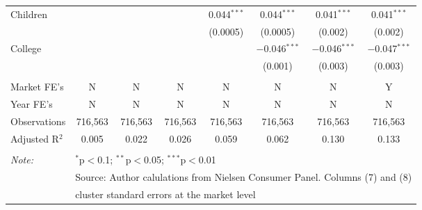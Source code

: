 \begin{table}[!htbp]
\begin{tabular}{@{\extracolsep{5pt}}lccccccc}
  Children &  &  &  & 0.044$^{***}$ & 0.044$^{***}$ & 0.041$^{***}$ & 0.041$^{***}$ \\ 
  &  &  &  & (0.0005) & (0.0005) & (0.002) & (0.002) \\ 
  College &  &  &  &  & $-$0.046$^{***}$ & $-$0.046$^{***}$ & $-$0.047$^{***}$ \\ 
  &  &  &  &  & (0.001) & (0.003) & (0.003) \\ 
 \hline \\[-1.8ex] 
Market FE's & N & N & N & N & N & N & Y \\ 
Year FE's & N & N & N & N & N & N & N \\ 
Observations & 716,563 & 716,563 & 716,563 & 716,563 & 716,563 & 716,563 & 716,563 \\ 
Adjusted R$^{2}$ & 0.005 & 0.022 & 0.026 & 0.059 & 0.062 & 0.130 & 0.133 \\ 
\hline 
\hline \\[-1.8ex] 
\textit{Note:}  & \multicolumn{7}{l}{$^{*}$p$<$0.1; $^{**}$p$<$0.05; $^{***}$p$<$0.01} \\ 
 & \multicolumn{7}{l}{Source: Author calulations from Nielsen Consumer Panel. Columns (7) and (8) } \\ 
 & \multicolumn{7}{l}{cluster standard errors at the market level} \\ 
\end{tabular} 
\end{table} 
